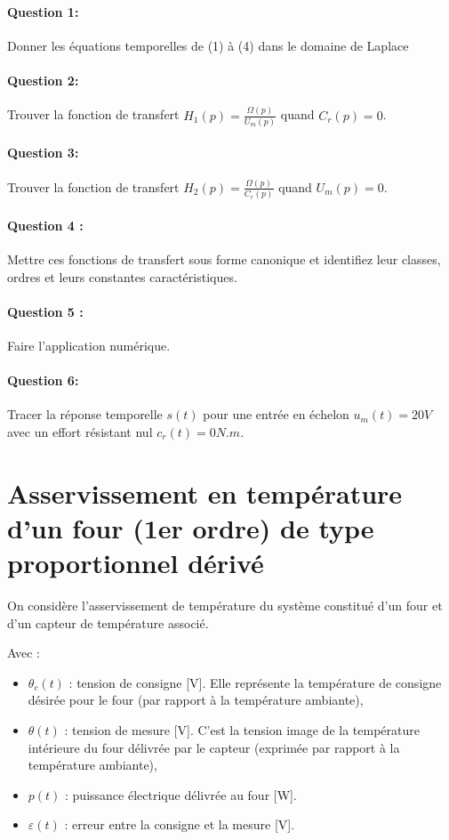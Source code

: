 \paragraph{Question 1:} Donner les équations temporelles de (1) à (4) dans le domaine de Laplace

\paragraph{Question 2:} Trouver la fonction de transfert $H_1(p)=\frac{\Omega(p)}{U_m(p)}$ quand $C_r(p)=0$.

\paragraph{Question 3:} Trouver la fonction de transfert $H_2(p)=\frac{\Omega(p)}{C_r(p)}$ quand $U_m(p)=0$.

\paragraph{Question 4 :} Mettre ces fonctions de transfert sous forme canonique et identifiez leur classes, ordres et leurs constantes caractéristiques.

\paragraph{Question 5 :} Faire l'application numérique.

\paragraph{Question 6:} Tracer la réponse temporelle $s(t)$ pour une entrée en échelon $u_m(t)=20V$ avec un effort résistant nul $c_r(t)=0N.m$.

\newpage

\section{Asservissement en température d'un four (1er ordre) de type proportionnel dérivé}

On considère l'asservissement de température du système constitué d'un four et d'un capteur de température associé.

Avec : 
\begin{itemize}
 \item $\theta_c(t)$ : tension de consigne [V]. Elle représente la température de consigne désirée pour le four (par rapport à la température ambiante),
 \item $\theta(t)$ : tension de mesure [V]. C'est la tension image de la température intérieure du four délivrée par le capteur (exprimée par rapport à la température ambiante),
 \item $p(t)$ : puissance électrique délivrée au four [W]. 
 \item $\varepsilon(t)$ : erreur entre la consigne et la mesure [V].
\end{itemize}

